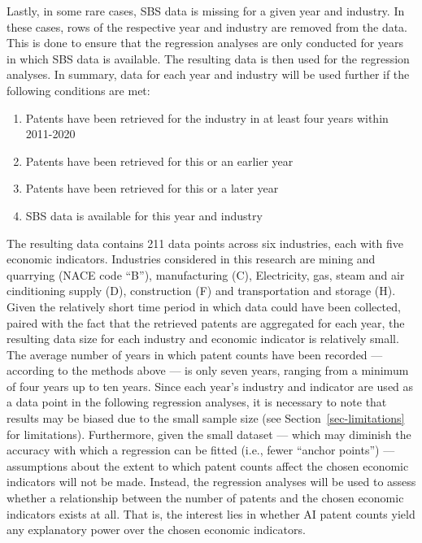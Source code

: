 \documentclass[
  12pt,
  a4paperpaper,
]{article}
\providecommand{\tightlist}{%
  \setlength{\itemsep}{0pt}\setlength{\parskip}{0pt}}\usepackage{longtable,booktabs,array}
\begin{document}
Lastly, in some rare cases, SBS data is missing for a given year and
industry. In these cases, rows of the respective year and industry are
removed from the data. This is done to ensure that the regression
analyses are only conducted for years in which SBS data is available.
The resulting data is then used for the regression analyses. In summary,
data for each year and industry will be used further if the following
conditions are met:

\begin{enumerate}
\def\labelenumi{\arabic{enumi}.}
\tightlist
\item
  Patents have been retrieved for the industry in at least four years
  within 2011-2020
\item
  Patents have been retrieved for this or an earlier year
\item
  Patents have been retrieved for this or a later year
\item
  SBS data is available for this year and industry
\end{enumerate}

The resulting data contains 211 data points across six industries, each
with five economic indicators. Industries considered in this research
are mining and quarrying (NACE code ``B''), manufacturing (C),
Electricity, gas, steam and air cinditioning supply (D), construction
(F) and transportation and storage (H). Given the relatively short time
period in which data could have been collected, paired with the fact
that the retrieved patents are aggregated for each year, the resulting
data size for each industry and economic indicator is relatively small.
The average number of years in which patent counts have been recorded
--- according to the methods above --- is only seven years, ranging from
a minimum of four years up to ten years. Since each year's industry and
indicator are used as a data point in the following regression analyses,
it is necessary to note that results may be biased due to the small
sample size (see Section~\ref{sec-limitations} for limitations).
Furthermore, given the small dataset --- which may diminish the accuracy
with which a regression can be fitted (i.e., fewer ``anchor points'')
--- assumptions about the extent to which patent counts affect the
chosen economic indicators will not be made. Instead, the regression
analyses will be used to assess whether a relationship between the
number of patents and the chosen economic indicators exists at all. That
is, the interest lies in whether AI patent counts yield any explanatory
power over the chosen economic indicators.
\end{document}
